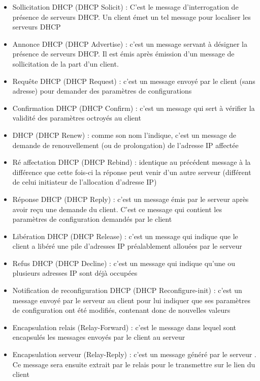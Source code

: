 \begin{itemize}
	\item Sollicitation DHCP (DHCP Solicit) : C’est le message d’interrogation de présence de serveurs DHCP. Un client émet un tel message pour localiser les serveurs DHCP 
	\item Annonce DHCP (DHCP Advertise) : c’est un message servant à désigner la présence de serveurs DHCP. Il est émis après émission d’un message de sollicitation de la part d’un client. 
	\item Requête DHCP (DHCP Request) : c’est un message envoyé par le client (sans adresse) pour demander des paramètres de configurations
	\item Confirmation DHCP (DHCP Confirm) : c’est un message qui sert à vérifier la validité des paramètres octroyés au client
	\item  DHCP (DHCP Renew) : comme son nom l’indique, c’est un message de demande de renouvellement (ou de prolongation) de l’adresse IP affectée 
	\item Ré affectation DHCP (DHCP Rebind) : identique au précédent message à la différence que cette fois-ci la réponse peut venir d’un autre serveur (différent de celui initiateur de l’allocation d’adresse IP)
	\item Réponse DHCP (DHCP Reply) : c’est un message émis par le serveur après avoir reçu une demande du client. C’est ce message qui contient les paramètres de configuration demandés par le client
	\item Libération DHCP (DHCP Release) : c’est un message qui indique que le client a libéré une pile d’adresses IP préalablement allouées par le serveur 
	\item Refus DHCP (DHCP Decline) : c’est un message qui indique qu’une ou plusieurs adresses IP sont déjà occupées 
	\item Notification de reconfiguration DHCP (DHCP Reconfigure-init) : c’est un message envoyé par le serveur au client pour lui indiquer que ses paramètres de configuration ont été modifiés, contenant donc de nouvelles valeurs 
	\item Encapsulation relais (Relay-Forward) : c’est le message dans lequel sont encapsulés les messages envoyés par le client au serveur
	\item Encapsulation serveur (Relay-Reply) : c’est un message généré par le serveur . Ce message sera ensuite extrait par le relais pour le transmettre sur le lien du client
\end{itemize}

